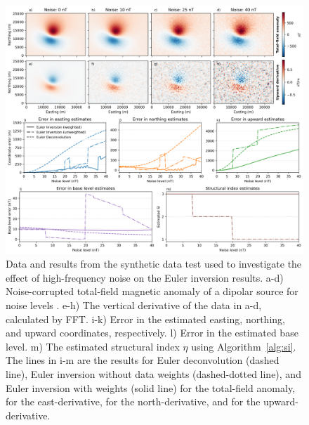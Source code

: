 \begin{figure}[tb!]
\centering
\includegraphics[width=1\linewidth]{figures/synthetic-noise-levels.png}
\caption{
    Data and results from the synthetic data test used to investigate the effect of high-frequency noise on the Euler inversion results.
    a-d) Noise-corrupted total-field magnetic anomaly of a dipolar source for noise levels \SynNoisePlotted.
    e-h) The vertical derivative of the data in a-d, calculated by FFT. 
    i-k) Error in the estimated easting, northing, and upward coordinates, respectively.
    l) Error in the estimated base level.
    m) The estimated structural index $\eta$ using Algorithm~\ref{alg:si}. 
    The lines in i-m are the results for Euler deconvolution (dashed line), Euler inversion without data weights (dashed-dotted line), and Euler inversion with weights (solid line) \SynNoiseWeightsF{} for the total-field anomaly, \SynNoiseWeightsE{} for the east-derivative, \SynNoiseWeightsN{} for the north-derivative, and \SynNoiseWeightsU{} for the upward-derivative.
}
\label{fig:noise}
\end{figure}

